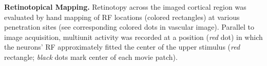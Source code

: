 \textbf{Retinotopical Mapping.} Retinotopy across the imaged cortical
region was evaluated by hand mapping of RF locations (colored rectangles)
at various penetration sites (see corresponding colored dots in vascular
image). Parallel to image acquisition, multiunit activity was recorded at a
position (\textit{red} dot) in which the neurons' RF approximately fitted
the center of the upper stimulus (\textit{red} rectangle; \textit{black} dots mark
center of each movie patch).
